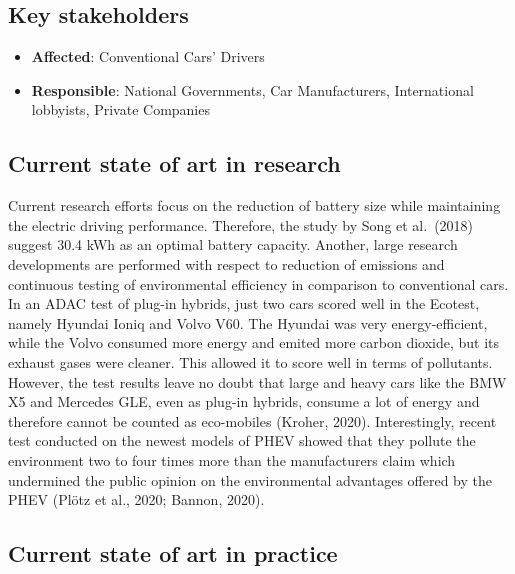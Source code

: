 \documentclass[
]{book}
\providecommand{\tightlist}{%
  \setlength{\itemsep}{0pt}\setlength{\parskip}{0pt}}
\begin{document}
\hypertarget{key-stakeholders-14}{%
\subsection*{Key stakeholders}\label{key-stakeholders-14}}

\begin{itemize}
\tightlist
\item
  \textbf{Affected}: Conventional Cars' Drivers
\item
  \textbf{Responsible}: National Governments, Car Manufacturers, International lobbyists, Private Companies
\end{itemize}

\hypertarget{current-state-of-art-in-research-14}{%
\subsection*{Current state of art in research}\label{current-state-of-art-in-research-14}}

Current research efforts focus on the reduction of battery size while maintaining the electric driving performance. Therefore, the study by Song et al.~(2018) suggest 30.4 kWh as an optimal battery capacity. Another, large research developments are performed with respect to reduction of emissions and continuous testing of environmental efficiency in comparison to conventional cars. In an ADAC test of plug-in hybrids, just two cars scored well in the Ecotest, namely Hyundai Ioniq and Volvo V60. The Hyundai was very energy-efficient, while the Volvo consumed more energy and emited more carbon dioxide, but its exhaust gases were cleaner. This allowed it to score well in terms of pollutants. However, the test results leave no doubt that large and heavy cars like the BMW X5 and Mercedes GLE, even as plug-in hybrids, consume a lot of energy and therefore cannot be counted as eco-mobiles (Kroher, 2020). Interestingly, recent test conducted on the newest models of PHEV showed that they pollute the environment two to four times more than the manufacturers claim which undermined the public opinion on the environmental advantages offered by the PHEV (Plötz et al., 2020; Bannon, 2020).

\hypertarget{current-state-of-art-in-practice-13}{%
\subsection*{Current state of art in practice}\label{current-state-of-art-in-practice-13}}
\end{document}
